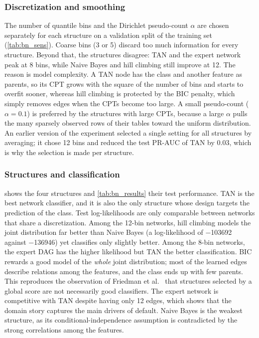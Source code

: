 \subsubsection{Discretization and smoothing}
The number of quantile bins and the Dirichlet pseudo-count $\alpha$ are chosen separately for each structure on a validation split of the training set (\cref{tab:bn_sens}).
Coarse bins (3 or 5) discard too much information for every structure.
Beyond that, the structures disagree: TAN and the expert network peak at 8 bins, while Naive Bayes and hill climbing still improve at 12.
The reason is model complexity.
A TAN node has the class and another feature as parents, so its CPT grows with the square of the number of bins and starts to overfit sooner, whereas hill climbing is protected by the BIC penalty, which simply removes edges when the CPTs become too large.
A small pseudo-count ($\alpha = 0.1$) is preferred by the structures with large CPTs, because a large $\alpha$ pulls the many sparsely observed rows of their tables toward the uniform distribution.
An earlier version of the experiment selected a single setting for all structures by averaging; it chose 12 bins and reduced the test PR-AUC of TAN by 0.03, which is why the selection is made per structure.



\subsubsection{Structures and classification}
 shows the four structures and \cref{tab:bn_results} their test performance.
TAN is the best network classifier, and it is also the only structure whose design targets the prediction of the class.
Test log-likelihoods are only comparable between networks that share a discretization.
Among the 12-bin networks, hill climbing models the joint distribution far better than Naive Bayes (a log-likelihood of \num{-103692} against \num{-136946}) yet classifies only slightly better.
Among the 8-bin networks, the expert DAG has the higher likelihood but TAN the better classification.
BIC rewards a good model of the \emph{whole} joint distribution; most of the learned edges describe relations among the features, and the class ends up with few parents.
This reproduces the observation of Friedman et al.~\cite{friedman1997bnc} that structures selected by a global score are not necessarily good classifiers.
The expert network is competitive with TAN despite having only 12 edges, which shows that the domain story captures the main drivers of default.
Naive Bayes is the weakest structure, as its conditional-independence assumption is contradicted by the strong correlations among the features.

